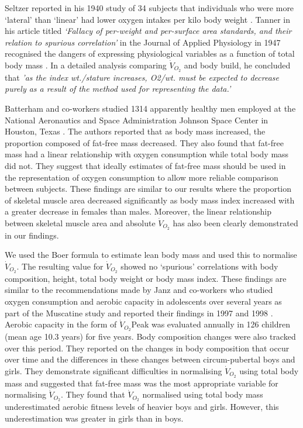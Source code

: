 Seltzer reported in his 1940 study of 34 subjects that individuals who were more `lateral' than `linear' had lower oxygen intakes per kilo body weight \parencite{seltzer_body_1940}.
Tanner in his article titled \textit{`Fallacy of per-weight and per-surface area standards, and their relation to spurious correlation'} in the Journal of Applied Physiology in 1947 recognised the dangers of expressing physiological variables as a function of total body mass \parencite{tanner_fallacy_1949}. 
In a detailed analysis comparing $\dot{V}_{O_2}$ and body build, he concluded that \textit{'as the index wt./stature increases, O2/wt. must be expected to decrease purely as a result of the method used for representing the data.'}

Batterham and co-workers studied 1314 apparently healthy men employed at the National Aeronautics and Space Administration Johnson Space Center in Houston, Texas \parencite{batterham_modeling_1999}. 
The authors reported that as body mass increased, the proportion composed of fat-free mass decreased. 
They also found that fat-free mass had a linear relationship with oxygen consumption while total body mass did not. 
They suggest that ideally estimates of fat-free mass should be used in the representation of oxygen consumption to allow more reliable comparison between subjects. 
These findings are similar to our results where the proportion of skeletal muscle area decreased significantly as body mass index increased with a greater decrease in females than males. 
Moreover, the linear relationship between skeletal muscle area and absolute $\dot{V}_{O_2}$ has also been clearly demonstrated in our findings. 

We used the Boer formula \parencite{boer_estimated_1984} to estimate lean body mass and used this to normalise $\dot{V}_{O_2}$. 
The resulting value for $\dot{V}_{O_2}$ showed no `spurious' correlations with body composition, height, total body weight or body mass index. 
These findings are similar to the recommendations made by Janz and co-workers who studied oxygen consumption and aerobic capacity in adolescents over several years as part of the Muscatine study and reported their findings in 1997 \parencite{janz_three-year_1997} and 1998 \parencite{janz_longitudinal_1998}. 
Aerobic capacity in the form of $\dot{V}_{O_2}$Peak was evaluated annually in 126 children (mean age 10.3 years) for five years. 
Body composition changes were also tracked over this period. 
They reported on the changes in body composition that occur over time and the differences in these changes between circum-pubertal boys and girls. 
They demonstrate significant difficulties in normalising $\dot{V}_{O_2}$ using total body mass and suggested that fat-free mass was the most appropriate variable for normalising $\dot{V}_{O_2}$. 
They found that $\dot{V}_{O_2}$ normalised using total body mass underestimated aerobic fitness levels of heavier boys and girls. 
However, this underestimation was greater in girls than in boys. 

